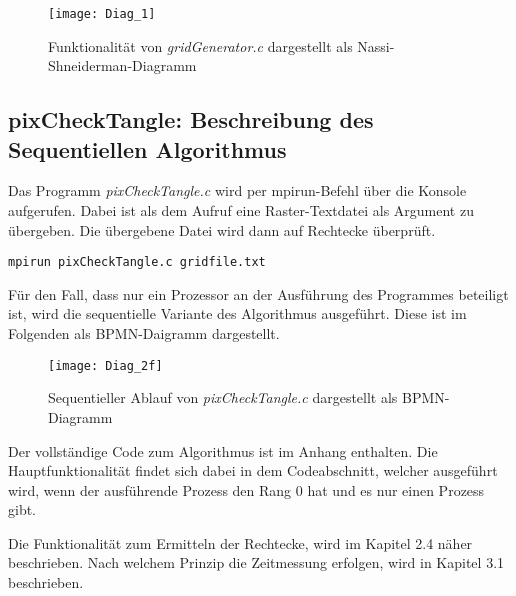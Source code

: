 \documentclass[
10pt, %
a4paper, %
oneside, %
headinclude,footinclude, %
BCOR5mm, %
]{scrartcl}
\begin{document}
\begin{figure}[h]
	\centering 
	\texttt{[image: Diag\_1]} 
	\caption[Funktionalität von \textit{gridGenerator.c}]{Funktionalität von \textit{gridGenerator.c} dargestellt als Nassi-Shneiderman-Diagramm}
\end{figure}


\subsection{pixCheckTangle: Beschreibung des Sequentiellen Algorithmus}

Das Programm \textit{pixCheckTangle.c} wird per mpirun-Befehl über die Konsole aufgerufen. Dabei ist als dem Aufruf eine Raster-Textdatei als Argument zu übergeben. Die übergebene Datei wird dann auf Rechtecke überprüft.\\

\begin{lstlisting}
mpirun pixCheckTangle.c gridfile.txt
\end{lstlisting}

Für den Fall, dass nur ein Prozessor an der Ausführung des Programmes beteiligt ist, wird die sequentielle Variante des Algorithmus ausgeführt. Diese ist im Folgenden als BPMN-Daigramm dargestellt.

\begin{figure}[h]
	\centering 
	\texttt{[image: Diag\_2f]} 
	\caption[Funktionalität von \textit{pixCheckTangle.c} sequentiell]{Sequentieller Ablauf von \textit{pixCheckTangle.c} dargestellt als BPMN-Diagramm }
	
\end{figure}

Der vollständige Code zum Algorithmus ist im Anhang enthalten. Die Hauptfunktionalität findet sich dabei in dem Codeabschnitt, welcher ausgeführt wird,   wenn der ausführende Prozess den Rang 0 hat und es nur einen Prozess gibt.
%
%
%
%	


Die Funktionalität zum Ermitteln der Rechtecke, wird im Kapitel 2.4 näher beschrieben. Nach welchem Prinzip die Zeitmessung erfolgen, wird in Kapitel 3.1 beschrieben.
\end{document}
